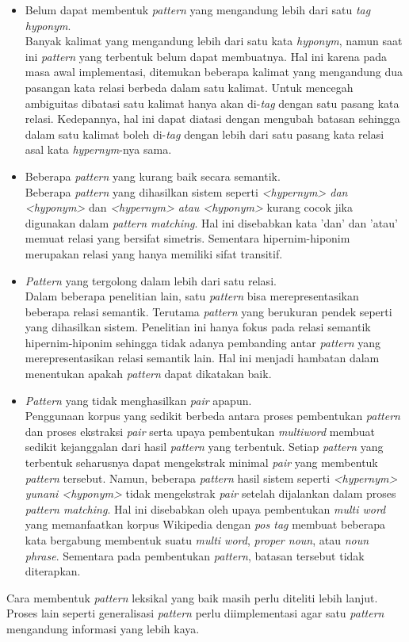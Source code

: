 \begin{itemize}
  \item Belum dapat membentuk \textit{pattern} yang mengandung lebih dari satu \textit{tag hyponym}. \\
  Banyak kalimat yang mengandung lebih dari satu kata \textit{hyponym}, namun saat ini \textit{pattern} yang terbentuk belum dapat membuatnya. Hal ini karena pada masa awal implementasi, ditemukan beberapa kalimat yang mengandung dua pasangan kata relasi berbeda dalam satu kalimat. Untuk mencegah ambiguitas dibatasi satu kalimat hanya akan di-\textit{tag} dengan satu pasang kata relasi. Kedepannya, hal ini dapat diatasi dengan mengubah batasan sehingga dalam satu kalimat boleh di-\textit{tag} dengan lebih dari satu pasang kata relasi asal kata \textit{hypernym}-nya sama. 
  \item Beberapa \textit{pattern} yang kurang baik secara semantik. \\
  Beberapa \textit{pattern} yang dihasilkan sistem seperti \textit{<hypernym> dan <hyponym>} dan  \textit{<hypernym> atau <hyponym>} kurang cocok jika digunakan dalam \textit{pattern matching}. Hal ini disebabkan kata 'dan' dan 'atau' memuat relasi yang bersifat simetris. Sementara hipernim-hiponim merupakan relasi yang hanya memiliki sifat transitif.
  \item \textit{Pattern} yang tergolong dalam lebih dari satu relasi. \\
  Dalam beberapa penelitian lain, satu \textit{pattern} bisa merepresentasikan beberapa relasi semantik. Terutama \textit{pattern} yang berukuran pendek seperti yang dihasilkan sistem. Penelitian ini hanya fokus pada relasi semantik hipernim-hiponim sehingga tidak adanya pembanding antar \textit{pattern} yang merepresentasikan relasi semantik lain. Hal ini menjadi hambatan dalam menentukan apakah \textit{pattern} dapat dikatakan baik.
  \item \textit{Pattern} yang tidak menghasilkan \textit{pair} apapun. \\
  Penggunaan korpus yang sedikit berbeda antara proses pembentukan \textit{pattern} dan proses ekstraksi \textit{pair} serta upaya pembentukan \textit{multiword} membuat sedikit kejanggalan dari hasil \textit{pattern} yang terbentuk. Setiap \textit{pattern} yang terbentuk seharusnya dapat mengekstrak minimal \textit{pair} yang membentuk \textit{pattern} tersebut. Namun, beberapa \textit{pattern} hasil sistem seperti \textit{<hypernym> yunani <hyponym>} tidak mengekstrak \textit{pair} setelah dijalankan dalam proses \textit{pattern matching}. Hal ini disebabkan oleh upaya pembentukan \textit{multi word} yang memanfaatkan korpus Wikipedia dengan \textit{pos tag} membuat beberapa kata bergabung membentuk suatu \textit{multi word}, \textit{proper noun}, atau \textit{noun phrase}. Sementara pada pembentukan \textit{pattern}, batasan tersebut tidak diterapkan.
\end{itemize}

Cara membentuk \textit{pattern} leksikal yang baik masih perlu diteliti lebih lanjut. Proses lain seperti generalisasi \textit{pattern} perlu diimplementasi agar satu \textit{pattern} mengandung informasi yang lebih kaya.
